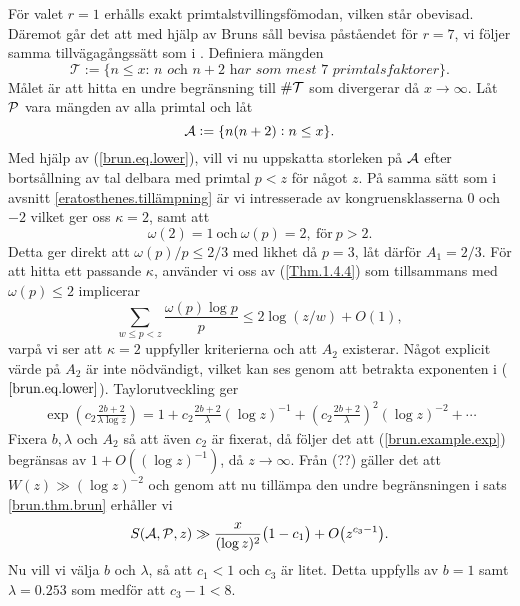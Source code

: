 \vspace{4pt}\noindent
För valet $r=1$ erhålls exakt primtalstvillingsfömodan, vilken står obevisad.
Däremot går det att med hjälp av Bruns såll bevisa påståendet för $r=7$, vi följer samma tillvägagångssätt som i \cite[Kap. 6.2]{cojocarumurty}.
Definiera mängden
\begin{equation*}
    \mathcal{T} := \{\textit{$n\leq x$: $n$ och $n+2$ har som mest $7$ primtalsfaktorer}\}.
\end{equation*}
Målet är att hitta en undre begränsning till $\card{\mathcal{T}}$ som divergerar då $x\to\infty$.
Låt $\P$ vara mängden av alla primtal och låt
\begin{equation*}
    \A := \{n(n+2): n\leq x\}.
\end{equation*}
Med hjälp av (\ref{brun.eq.lower}), vill vi nu uppskatta storleken på $\A$ efter bortsållning av tal delbara med primtal $p<z$ för något $z$. 
På samma sätt som i avsnitt \ref{eratosthenes.tillämpning} är vi intresserade av kongruensklasserna $0$ och $-2$ vilket ger oss $\kappa=2$, samt att
\begin{equation*}
    \omega(2)=1\ \text{och}\ \omega(p)=2,\ \text{för}\ p>2.
\end{equation*}
Detta ger direkt att $\omega(p)/p\leq 2/3$ med likhet då $p=3$, låt därför $A_1=2/3$.
För att hitta ett passande $\kappa$, använder vi oss av (\ref{Thm.1.4.4}) som tillsammans med $\omega(p)\leq2$ implicerar
\begin{equation*}
    \sum_{w\leq p<z} \frac{\omega(p)\log p}{p} \leq 2\log\left(z/w\right) + O(1),
\end{equation*}
varpå vi ser att $\kappa=2$ uppfyller kriterierna och att $A_2$ existerar.
Något explicit värde på $A_2$ är inte nödvändigt, vilket kan ses genom att betrakta exponenten i ($\ref{brun.eq.lower}$). Taylorutveckling ger
\begin{align}\label{brun.example.exp}
    \exp\left(c_2\frac{2b+2}{\lambda\log z}\right) = 1 + c_2\frac{2b+2}{\lambda}(\log z)^{-1} + \left(c_2\frac{2b+2}{\lambda}\right)^2(\log z)^{-2} + \cdots
\end{align}
Fixera $b,\lambda$ och $A_2$ så att även $c_2$ är fixerat, då följer det att (\ref{brun.example.exp}) begränsas av $1+O((\log z)^{-1})$, då $z\to\infty$.
Från (??) gäller det att $W(z) \gg (\log z)^{-2}$
och genom att nu tillämpa den undre begränsningen i sats \ref{brun.thm.brun} erhåller vi
\begin{equation} \label{brun.example.sap}
    \S{A}{P}{z} \gg \frac{x}{(\log z)^2}\bigl(1 - c_1\bigr) + O\bigl(z^{c_3 - 1}\bigr).
\end{equation}
Nu vill vi välja $b$ och $\lambda$, så att $c_1<1$ och $c_3$ är litet. 
Detta uppfylls av $b=1$ samt $\lambda=0.253$ som medför att $c_3-1<8$.

